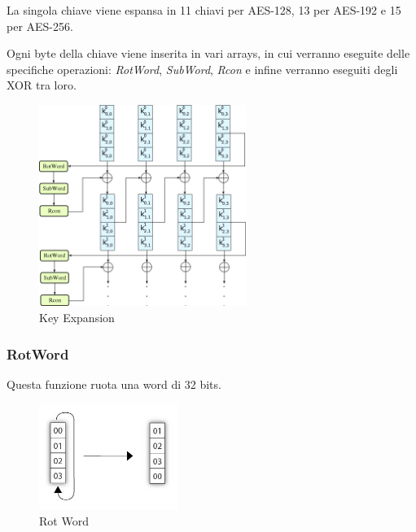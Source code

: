 
\textsf{\small La singola chiave viene espansa in 11 chiavi per AES-128, 13 per AES-192 e 15 per AES-256.}

   

\textsf{\small Ogni byte della chiave viene inserita in vari arrays, in cui verranno eseguite delle specifiche operazioni: \emph{RotWord}, \emph{SubWord}, \emph{Rcon} e infine verranno eseguiti degli XOR tra loro.}

\begin{figure}[H]
	\centering
	\includegraphics[width=0.6\textwidth, height=0.6\textheight, keepaspectratio]{./images/key_expansion/AES-Key_Schedule_128-bit_key.png}
	\caption{Key Expansion}
	\label{fig:key_expansion2}
\end{figure}

\subsubsection{RotWord}


\textsf{\small Questa funzione ruota una word di 32 bits.}

\begin{figure}[H]
	\centering
	\includegraphics[width=0.4\textwidth, height=0.4\textheight, keepaspectratio]{./images/key_expansion/key_schedule-rot_word.png}
	\caption{Rot Word}
	\label{fig:rot_word2}
\end{figure}

